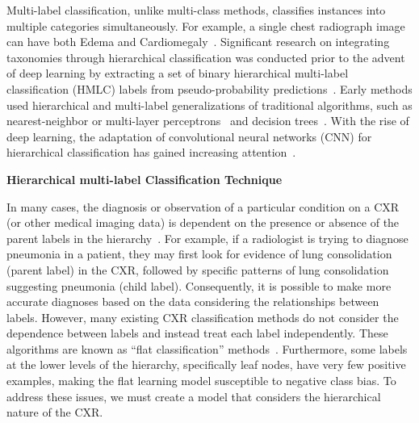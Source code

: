 Multi-label classification, unlike multi-class methods, classifies instances into multiple categories simultaneously. For example, a single chest radiograph image can have both Edema and Cardiomegaly~\cite{harvey_Standardised_2019,tsoumakas_MultiLabel_2007}. Significant research on integrating taxonomies through hierarchical classification was conducted prior to the advent of deep learning by extracting a set of binary hierarchical multi-label classification (HMLC) labels from pseudo-probability predictions~\cite{bi_BayesOptimal_2015}. Early methods used hierarchical and multi-label generalizations of traditional algorithms, such as nearest-neighbor or multi-layer perceptrons~\cite{pourghassem_ContentBased_2008} and decision trees~\cite{dimitrovski_Hierarchical_2011}. With the rise of deep learning, the adaptation of convolutional neural networks (CNN) for hierarchical classification has gained increasing attention~\cite{guo_CNNRNN_2018,kowsari_HDLTex_2017,redmon_YOLO9000_2017,roy_TreeCNN_2020}.

\textbf{Hierarchical multi-label Classification Technique}

In many cases, the diagnosis or observation of a particular condition on a CXR (or other medical imaging data) is dependent on the presence or absence of the parent labels in the hierarchy~\cite{vaneeden_Relationship_2012}. For example, if a radiologist is trying to diagnose pneumonia in a patient, they may first look for evidence of lung consolidation (parent label) in the CXR, followed by specific patterns of lung consolidation suggesting pneumonia (child label). Consequently, it is possible to make more accurate diagnoses based on the data considering the relationships between labels. However, many existing CXR classification methods do not consider the dependence between labels and instead treat each label independently. These algorithms are known as ``flat classification'' methods~\cite{alaydie_Exploiting_2012}. Furthermore, some labels at the lower levels of the hierarchy, specifically leaf nodes, have very few positive examples, making the flat learning model susceptible to negative class bias. To address these issues, we must create a model that considers the hierarchical nature of the CXR\@.

